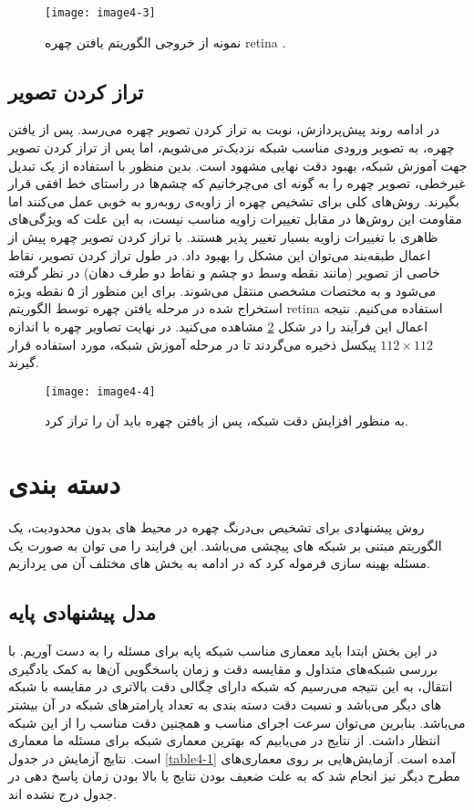 \begin{figure}[h]
\centering
  \texttt{[image: image4-3]}
  \caption{نمونه از خروجی الگوریتم یافتن چهره retina \cite{deng2019retinaface}.}
  \label{image4-3}
\end{figure}

\subsection{تراز کردن تصویر}
در ادامه روند پیش‌پردازش، نوبت به تراز کردن تصویر چهره  می‌رسد. پس از یافتن چهره، به تصویر ورودی مناسب شبکه نزدیک‌تر می‌شویم، اما پس از تراز کردن تصویر جهت آموزش شبکه، بهبود دقت نهایی مشهود است.  بدین منظور با استفاده از یک تبدیل غیرخطی، تصویر چهره را به گونه ای می‌چرخانیم که چشم‌ها در راستای خط افقی قرار بگیرند. روش‌های کلی برای تشخیص چهره از زاویه‌ی روبه‌رو به خوبی عمل می‌کنند اما مقاومت این روش‌ها در مقابل تغییرات زاویه مناسب نیست، به این علت که ویژگی‌های ظاهری با تغییرات زاویه بسیار تغییر پذیر هستند. با تراز کردن تصویر چهره پیش از اعمال طبقه‌بند می‌توان این مشکل را بهبود داد. در طول ‌تراز کردن تصویر، نقاط خاصی از تصویر (مانند نقطه‌ وسط دو چشم و نقاط دو طرف دهان) در نظر گرفته می‌شود و به مختصات مشخصی منتقل می‌شوند. برای این منظور از ۵ نقطه ویژه استخراج شده در مرحله یافتن چهره توسط الگوریتم retina استفاده می‌کنیم. نتیجه اعمال این فرآیند را در شکل \ref{image4-4} مشاهده می‌کنید. در نهایت تصاویر چهره با اندازه $112 \times 112$ پیکسل ذخیره می‌گردند تا در مرحله آموزش شبکه، مورد استفاده قرار گیرند.
\begin{figure}[h]
\centering
  \texttt{[image: image4-4]}
  \caption{به منظور افزایش دقت شبکه، پس از یافتن چهره باید آن را تراز کرد.}
  \label{image4-4}
\end{figure}

\section{دسته بندی}
روش پیشنهادی برای تشخیص بی‌درنگ چهره در محیط های بدون محدودیت، یک الگوریتم مبتنی بر شبکه های پیچشی می‌باشد. این فرایند را می توان به صورت یک مسئله بهینه سازی فرموله کرد که در ادامه به بخش های مختلف آن می پردازیم.

\subsection{مدل پیشنهادی پایه}
در این بخش ابتدا باید معماری مناسب شبکه پایه برای مسئله را به دست آوریم. با بررسی شبکه‌های متداول و مقایسه دقت و زمان پاسخگویی آن‌ها به کمک یادگیری انتقال، به این نتیجه می‌رسیم که شبکه  دارای چگالی دقت بالاتری در مقایسه با شبکه های دیگر می‌باشد و نسبت دقت دسته بندی به تعداد پارامترهای شبکه در آن‌ بیشتر می‌باشد. بنابرین می‌توان سرعت اجرای مناسب و همچنین دقت مناسب را از این شبکه‌ انتظار داشت. از نتایج در می‌یابیم که بهترین معماری شبکه برای مسئله ما معماری  است. نتایج آزمایش در جدول \ref{table4-1} آمده است. آزمایش‌هایی بر روی معماری‌های مطرح دیگر نیز انجام شد که به علت ضعیف بودن نتایج یا بالا بودن زمان پاسخ دهی در جدول درج نشده اند.

